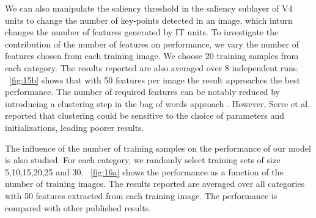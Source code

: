 \documentclass[10pt]{article}
\begin{document}
We can also manipulate the saliency threshold in the saliency sublayer of V4 units
to change the number of key-points detected in an image,
which inturn changes the number of features generated by IT units.
To investigate the contribution of the number of features on performance,
we vary the number of features chosen from each training image.
We choose 20 training samples from each category.
The results reported are also averaged over 8 independent runs.
\figurename~\ref{fig:15b} shows that 
with 50 features per image the result approaches the best performance.
The number of required features can be notably reduced by introducing 
a clustering step in the bag of words approach \cite{csurka2004}.
However, Serre et al. \cite{serre2007} reported that clustering could
be sensitive to the choice of parameters and initializations,
leading poorer results.

The influence of the number of training samples 
on the performance of our model is also studied.
For each category, we randomly select training sets of size
5,10,15,20,25 and 30.
\figurename~\ref{fig:16a} shows the performance as
a function of the number of training images.
The results reported are averaged over all categories
with 50 features extracted from each training image.
The performance is compared with other published results.
\end{document}
